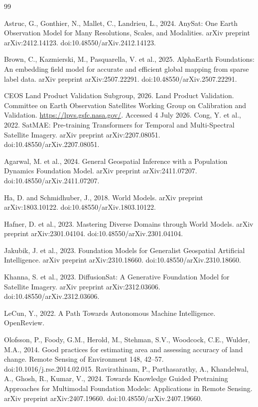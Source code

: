 \documentclass{article}
\begin{document}
\begin{thebibliography}{99}

Astruc, G., Gonthier, N., Mallet, C., Landrieu, L., 2024. AnySat: One Earth Observation Model for Many Resolutions, Scales, and Modalities. arXiv preprint arXiv:2412.14123. doi:10.48550/arXiv.2412.14123.

Brown, C., Kazmierski, M., Pasquarella, V. et al., 2025. AlphaEarth Foundations: An embedding field model for accurate and efficient global mapping from sparse label data. arXiv preprint arXiv:2507.22291. doi:10.48550/arXiv.2507.22291.

CEOS Land Product Validation Subgroup, 2026. Land Product Validation. Committee on Earth Observation Satellites Working Group on Calibration and Validation. \url{https://lpvs.gsfc.nasa.gov/}. Accessed 4 July 2026.
Cong, Y. et al., 2022. SatMAE: Pre-training Transformers for Temporal and Multi-Spectral Satellite Imagery. arXiv preprint arXiv:2207.08051. doi:10.48550/arXiv.2207.08051.

Agarwal, M. et al., 2024. General Geospatial Inference with a Population Dynamics Foundation Model. arXiv preprint arXiv:2411.07207. doi:10.48550/arXiv.2411.07207.

Ha, D. and Schmidhuber, J., 2018. World Models. arXiv preprint arXiv:1803.10122. doi:10.48550/arXiv.1803.10122.

Hafner, D. et al., 2023. Mastering Diverse Domains through World Models. arXiv preprint arXiv:2301.04104. doi:10.48550/arXiv.2301.04104.

Jakubik, J. et al., 2023. Foundation Models for Generalist Geospatial Artificial Intelligence. arXiv preprint arXiv:2310.18660. doi:10.48550/arXiv.2310.18660.

Khanna, S. et al., 2023. DiffusionSat: A Generative Foundation Model for Satellite Imagery. arXiv preprint arXiv:2312.03606. doi:10.48550/arXiv.2312.03606.

LeCun, Y., 2022. A Path Towards Autonomous Machine Intelligence. OpenReview.

Olofsson, P., Foody, G.M., Herold, M., Stehman, S.V., Woodcock, C.E., Wulder, M.A., 2014. Good practices for estimating area and assessing accuracy of land change. Remote Sensing of Environment 148, 42--57. doi:10.1016/j.rse.2014.02.015.
Ravirathinam, P., Parthasarathy, A., Khandelwal, A., Ghosh, R., Kumar, V., 2024. Towards Knowledge Guided Pretraining Approaches for Multimodal Foundation Models: Applications in Remote Sensing. arXiv preprint arXiv:2407.19660. doi:10.48550/arXiv.2407.19660.


\end{thebibliography}
\end{document}

